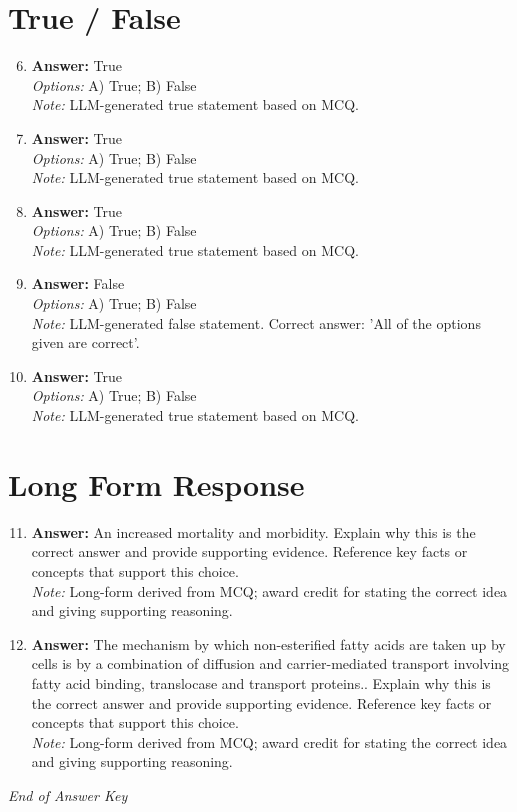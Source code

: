 \documentclass[12pt]{article}
\begin{document}
\section*{True / False}
\begin{enumerate}[label=\arabic*.]
\setcounter{enumi}{5}
\item \textbf{Answer:} True
\\ \textit{Options:} A) True; B) False
\\ \textit{Note:} LLM-generated true statement based on MCQ.
\item \textbf{Answer:} True
\\ \textit{Options:} A) True; B) False
\\ \textit{Note:} LLM-generated true statement based on MCQ.
\item \textbf{Answer:} True
\\ \textit{Options:} A) True; B) False
\\ \textit{Note:} LLM-generated true statement based on MCQ.
\item \textbf{Answer:} False
\\ \textit{Options:} A) True; B) False
\\ \textit{Note:} LLM-generated false statement. Correct answer: 'All of the options given are correct'.
\item \textbf{Answer:} True
\\ \textit{Options:} A) True; B) False
\\ \textit{Note:} LLM-generated true statement based on MCQ.
\end{enumerate}

\section*{Long Form Response}
\begin{enumerate}[label=\arabic*.]
\setcounter{enumi}{10}
\item \textbf{Answer:} An increased mortality and morbidity. Explain why this is the correct answer and provide supporting evidence. Reference key facts or concepts that support this choice.
\\ \textit{Note:} Long-form derived from MCQ; award credit for stating the correct idea and giving supporting reasoning.
\item \textbf{Answer:} The mechanism by which non-esterified fatty acids are taken up by cells is by a combination of diffusion and carrier-mediated transport involving fatty acid binding, translocase and transport proteins.. Explain why this is the correct answer and provide supporting evidence. Reference key facts or concepts that support this choice.
\\ \textit{Note:} Long-form derived from MCQ; award credit for stating the correct idea and giving supporting reasoning.
\end{enumerate}

\vfill
\noindent\textit{End of Answer Key}
\end{document}
